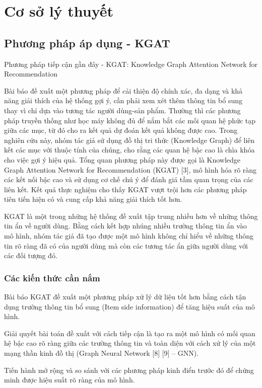 \section{Cơ sở lý thuyết}
\subsection{Phương pháp áp dụng - KGAT}
Phương pháp tiếp cận gần đây - KGAT: Knowledge Graph Attention Network for Recommendation

Bài báo đề xuất một phương pháp để cải thiện độ chính xác, đa dạng và khả năng giải thích của hệ thống gợi ý, cần phải xem xét thêm thông tin bổ sung thay vì chỉ dựa vào tương tác người dùng-sản phẩm. Thường thì các phương pháp truyền thống như học máy không đủ để nắm bắt các mối quan hệ phức tạp giữa các mục, từ đó cho ra kết quả dự đoán kết quả không được cao. Trong nghiên cứu này, nhóm tác giả sử dụng đồ thị tri thức (Knowledge Graph) để liên kết các mục với thuộc tính của chúng, cho rằng các quan hệ bậc cao là chìa khóa cho việc gợi ý hiệu quả. Tổng quan phương pháp này được gọi là Knowledge Graph Attention Network for Recommendation (KGAT) [3], mô hình hóa rõ ràng các kết nối bậc cao và sử dụng cơ chế chú ý để đánh giá tầm quan trọng của các liên kết. Kết quả thực nghiệm cho thấy KGAT vượt trội hơn các phương pháp tiên tiến hiện có và cung cấp khả năng giải thích tốt hơn.

KGAT là một trong những hệ thống đề xuất tập trung nhiều hơn về những thông tin ẩn về người dùng. Bằng cách kết hợp nhúng nhiều trường thông tin ẩn vào mô hình, nhóm tác giả đã tạo được một mô hình không chỉ hiểu về những thông tin rõ ràng đã có của người dùng mà còn các tương tác ẩn giữa người dùng với các đối tượng đó.

\subsubsection{Các kiến thức cần nắm}
Bài báo KGAT đề xuất một phương pháp xử lý dữ liệu tốt hơn bằng cách tận dụng trường thông tin bổ sung (Item side information) để tăng hiệu suất của mô hình.

Giải quyết bài toán đề xuất với cách tiếp cận là tạo ra một mô hình có mối quan hệ bậc cao rõ ràng giữa các trường thông tin và toàn diện với cách xử lý của một mạng thần kinh đồ thị (Graph Neural Network [8] [9] – GNN).

Tiến hành mở rộng và so sánh với các phương pháp kinh điển trước đó để chứng minh được hiệu suất rõ ràng của mô hình.


